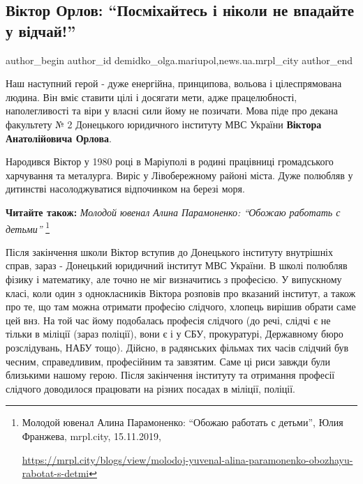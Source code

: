  
 
 
 
 
 
\subsection{Віктор Орлов: \enquote{Посміхайтесь і ніколи не впадайте у відчай!}}
\label{sec:18_11_2019.stz.news.ua.mrpl_city.1.viktor_orlov_posmihajtes_ne_vpadajte_u_vidchaj}
 
\ifcmt
 author_begin
   author_id demidko_olga.mariupol,news.ua.mrpl_city
 author_end
\fi

Наш наступний герой - дуже енергійна, принципова, вольова і цілеспрямована
людина. Він вміє ставити цілі і досягати мети, адже працелюбності,
наполегливості та віри у власні сили йому не позичати. Мова піде про декана
факультету № 2 Донецького юридичного інституту МВС України \textbf{Віктора
Анатолійовича Орлова}.


Народився Віктор у 1980 році в Маріуполі в родині працівниці громадського
харчування та металурга. Виріс у Лівобережному районі міста. Дуже полюбляв у
дитинстві насолоджуватися відпочинком на березі моря.

\textbf{Читайте також:} \emph{Молодой ювенал Алина Парамоненко: \enquote{Обожаю работать с детьми}}%
\footnote{Молодой ювенал Алина Парамоненко: \enquote{Обожаю работать с детьми}, Юлия Франжева, mrpl.city, 15.11.2019, \par%
\url{https://mrpl.city/blogs/view/molodoj-yuvenal-alina-paramonenko-obozhayu-rabotat-s-detmi}}

Після закінчення школи Віктор вступив до Донецького інституту внутрішніх справ,
зараз - Донецький юридичний інститут МВС України. В школі полюбляв фізику і
математику, але точно не міг визначитись з професією. У випускному класі, коли
один з однокласників Віктора розповів про вказаний інститут, а також про те, що
там можна отримати професію слідчого, хлопець вирішив обрати саме цей внз. На
той час йому подобалась професія слідчого (до речі, слідчі є не тільки в
міліції (зараз поліції), вони є і у СБУ, прокуратурі, Державному бюро
розслідувань, НАБУ тощо). Дійсно, в радянських фільмах тих часів слідчий був
чесним, справедливим, професійним та завзятим. Саме ці риси завжди були
близькими нашому герою. Після закінчення інституту та отримання професії
слідчого доводилося працювати на різних посадах в міліції, поліції.

